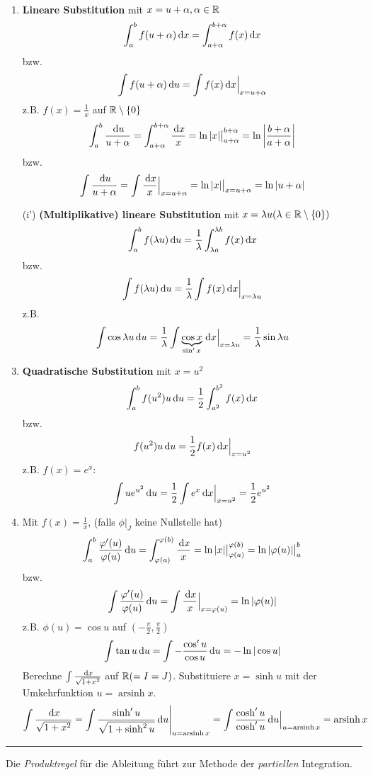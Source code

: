 \begin{example} \
\begin{enumerate}
 \item \textbf{Lineare Substitution} mit $x = u+\alpha, \alpha \in \mathbb{R}$ 
 $$
	\int_a^b f(u+\alpha) \, \mathrm{d} x = \int_{a + \alpha}^{b+ \alpha} f(x) \, \mathrm{d} x
 $$
 bzw. 
 $$
 	\int f( u +\alpha) \, \mathrm{d} u = \int f(x) \, \mathrm{d} x \Big\vert_{x = u + \alpha}
 $$
 z.B. $f(x) = \frac{1}{x}$ auf $\mathbb{R} \setminus \{0\}$
 $$ \int_a^b \frac{\, \mathrm{d} u}{u+\alpha} = \int_{a+\alpha}^{b+\alpha} \frac{\, \mathrm{d} x}{x} = \ln |x| \big\vert^{b+\alpha}_{a+\alpha} = \ln \left| \frac{b+\alpha}{a+\alpha} \right|$$
 bzw.
 $$ \int \frac{\, \mathrm{d} u}{u+\alpha} = \int \frac{\, \mathrm{d} x}{x} \Big\vert_{x= u+\alpha}= \ln |x| \big\vert_{x = u + \alpha} = \ln |u + \alpha|$$
 \item[(i')] \textbf{(Multiplikative) lineare Substitution} mit $x= \lambda u (\lambda \in \mathbb{R} \setminus \{0\})$
 	$$ \int_a^b f(\lambda u) \, \mathrm{d} u = \frac{1}{\lambda} \int_{\lambda a}^{\lambda b} f(x) \, \mathrm{d} x$$ bzw. 
 	$$ \int f(\lambda u) \, \mathrm{d} u = \frac{1}{\lambda} \int f(x) \, \mathrm{d} x \Big\vert_{x = \lambda u}$$
 	z.B.
 $$\int \cos \lambda u \, \mathrm{d} u = \frac{1}{\lambda} \int \underbrace{\cos x}_{\sin' x} \, \mathrm{d} x \Big\vert_{x= \lambda u} = \frac{1}{\lambda} \sin \lambda u$$
 \item \textbf{Quadratische Substitution} mit $x = u^2$
 $$ \int_a^b f(u^2) u \, \mathrm{d} u =\frac{1}{2} \int_{a^2}^{b^2} f(x) \, \mathrm{d} x$$
 bzw.
 $$ f(u^2) u \, \mathrm{d} u = \frac{1}{2} f(x) \, \mathrm{d} x \Big\vert_{x=u^2}$$
 z.B. $f(x) = e^x$:
 $$ \int u  e^{u^2} \, \mathrm{d} u = \frac{1}{2} \int e^x \, \mathrm{d} x \Big\vert_{x=u^2} = \frac{1}{2} e^{u^2}$$
 \item Mit $f(x) = \frac{1}{x}$, (falls $\phi|_J$ keine Nullstelle hat)
 $$ \int_a^b \frac{\varphi'(u)}{\varphi(u)} \, \mathrm{d} u = \int_{\varphi(a)}^{\varphi(b)}\frac{\, \mathrm{d} x}{x} = \ln |x| \big\vert^{\varphi(b)}_{\varphi(a)} = \ln |\varphi(u)| \big\vert_{a}^b$$
 bzw.
 $$ \int \frac{\varphi'(u)}{ \varphi(u)} \, \mathrm{d} u = \int \frac{\, \mathrm{d} x}{x} \Big\vert_{x=\varphi(u)} = \ln | \varphi(u) |$$
 z.B. $\phi(u)= \cos u$ auf $(-\frac{\pi}{2},\frac{\pi}{2})$
 $$\int \tan u \, \mathrm{d} u  = \int -\frac{\cos' u}{\cos u} \, \mathrm{d} u= -\ln |\cos u|$$
 Berechne $\int \frac{\, \mathrm{d} x}{\sqrt{1+x^2}}$ auf $\mathbb{R} (=I =J)$. Substituiere $x=\sinh u$ mit der Umkehrfunktion $u = \operatorname{arsinh} x$.
 $$\int \frac{\, \mathrm{d} x}{\sqrt{1+x^2}} = \int \frac{\sinh' u}{\sqrt{1+\sinh^2 u}} \, \mathrm{d} u \Bigg\vert_{u = \operatorname{arsinh}x}= \int \frac{\cosh' u}{\cosh' u} \, \mathrm{d} u\Big\vert_{u = \operatorname{arsinh}x} = \operatorname{arsinh}x$$
\end{enumerate}
\rule{\textwidth}{0.4pt}
Die \emph{Produktregel} für die Ableitung führt zur Methode der \emph{partiellen} Integration.

\end{example}

